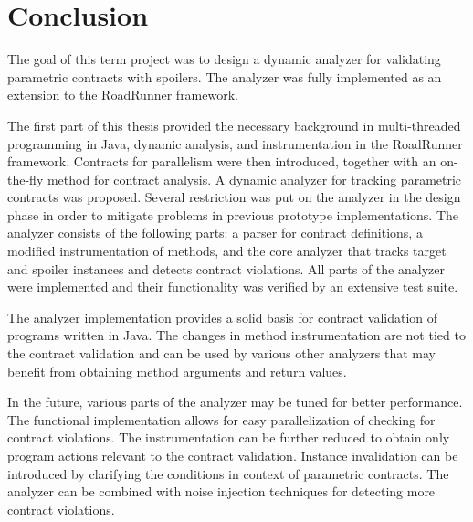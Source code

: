 \chapter{Conclusion}

The goal of this term project was to design a dynamic analyzer for validating
parametric contracts with spoilers. The analyzer was fully implemented as an
extension to the RoadRunner framework.

The first part of this thesis provided the necessary background in
multi-threaded programming in Java, dynamic analysis, and instrumentation in the
RoadRunner framework. Contracts for parallelism were then introduced, together
with an on-the-fly method for contract analysis. A dynamic analyzer for tracking
parametric contracts was proposed. Several restriction was put on the analyzer
in the design phase in order to mitigate problems in previous prototype
implementations. The analyzer consists of the following parts: a parser for
contract definitions, a modified instrumentation of methods, and the core
analyzer that tracks target and spoiler instances and detects contract
violations. All parts of the analyzer were implemented and their functionality
was verified by an extensive test suite.

The analyzer implementation provides a solid basis for contract validation of
programs written in Java. The changes in method instrumentation are not tied to
the contract validation and can be used by various other analyzers that may
benefit from obtaining method arguments and return values.

In the future, various parts of the analyzer may be tuned for better
performance. The functional implementation allows for easy parallelization of
checking for contract violations. The instrumentation can be further reduced to
obtain only program actions relevant to the contract validation. Instance
invalidation can be introduced by clarifying the conditions in context of
parametric contracts. The analyzer can be combined with noise injection
techniques for detecting more contract violations.
